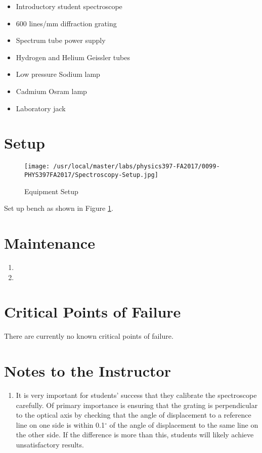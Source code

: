 \begin{minipage}[t]{0.6\textwidth}
\begin{itemize}[noitemsep]
\item Introductory student spectroscope
\item 600 lines/mm diffraction grating
\item Spectrum tube power supply
\item Hydrogen and Helium Geissler tubes 
\end{itemize}
\end{minipage}
\begin{minipage}[t]{0.4\textwidth}
\begin{itemize}[noitemsep]
\item Low pressure Sodium lamp
\item Cadmium Osram lamp
\item Laboratory jack
\end{itemize}
\end{minipage}

\section{Setup}
\begin{figure}
\texttt{[image: /usr/local/master/labs/physics397-FA2017/0099-PHYS397FA2017/Spectroscopy-Setup.jpg]}
\caption{Equipment Setup}
\label{pic:SPsetup}
\end{figure}

Set up bench as shown in Figure \ref{pic:SPsetup}.

\section{Maintenance}

\begin{enumerate}
\item 
\item 
\end{enumerate}

\section{Critical Points of Failure}

There are currently no known critical points of failure.

\section{Notes to the Instructor}
\begin{enumerate}
\item It is very important for students' success that they calibrate the spectroscope carefully. Of primary importance is ensuring that the grating is perpendicular to the optical axis by checking that the angle of displacement to a reference line on one side is within 0.1$^{\circ}$ of the angle of displacement to the same line on the other side. If the difference is more than this, students will likely achieve unsatisfactory results.
\end{enumerate}


